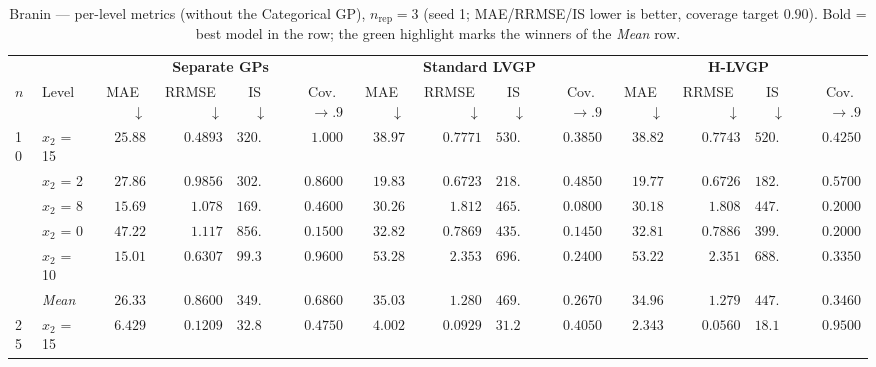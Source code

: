 \begin{table}[htbp]
\centering
\scriptsize
\setlength{\tabcolsep}{2.5pt}
\setlength{\fboxsep}{1pt}
\caption{Branin --- per-level metrics (without the Categorical GP), $n_{\mathrm{rep}}=3$ (seed 1; MAE/RRMSE/IS lower is better, coverage target $0.90$). Bold = best model in the row; the green highlight marks the winners of the \emph{Mean} row.}
\label{tab:branin_hetero_nrep03_nocat}
\begin{tabular}{llrrrrrrrrrrrr}
\toprule
 & & \multicolumn{4}{c}{\textbf{Separate GPs}} & \multicolumn{4}{c}{\textbf{Standard LVGP}} & \multicolumn{4}{c}{\textbf{H-LVGP}} \\
\cmidrule(lr){3-6} \cmidrule(lr){7-10} \cmidrule(lr){11-14}
$n$ & Level & MAE~$\downarrow$ & RRMSE~$\downarrow$ & IS~$\downarrow$ & Cov.~$\to.9$ & MAE~$\downarrow$ & RRMSE~$\downarrow$ & IS~$\downarrow$ & Cov.~$\to.9$ & MAE~$\downarrow$ & RRMSE~$\downarrow$ & IS~$\downarrow$ & Cov.~$\to.9$ \\
\midrule
\multirow{6}{*}{10} & $x_2$ = 15 & {\boldmath$25.88$} & {\boldmath$0.4893$} & {\boldmath$320.7$} & {\boldmath$1.000$} & $38.97$ & $0.7771$ & $530.2$ & $0.3850$ & $38.82$ & $0.7743$ & $520.3$ & $0.4250$ \\
 & $x_2$ = 2 & $27.86$ & $0.9856$ & $302.1$ & {\boldmath$0.8600$} & $19.83$ & {\boldmath$0.6723$} & $218.5$ & $0.4850$ & {\boldmath$19.77$} & $0.6726$ & {\boldmath$182.3$} & $0.5700$ \\
 & $x_2$ = 8 & {\boldmath$15.69$} & {\boldmath$1.078$} & {\boldmath$169.5$} & {\boldmath$0.4600$} & $30.26$ & $1.812$ & $465.1$ & $0.0800$ & $30.18$ & $1.808$ & $447.6$ & $0.2000$ \\
 & $x_2$ = 0 & $47.22$ & $1.117$ & $856.5$ & $0.1500$ & $32.82$ & {\boldmath$0.7869$} & $435.2$ & $0.1450$ & {\boldmath$32.81$} & $0.7886$ & {\boldmath$399.3$} & {\boldmath$0.2000$} \\
 & $x_2$ = 10 & {\boldmath$15.01$} & {\boldmath$0.6307$} & {\boldmath$99.37$} & {\boldmath$0.9600$} & $53.28$ & $2.353$ & $696.4$ & $0.2400$ & $53.22$ & $2.351$ & $688.1$ & $0.3350$ \\
 & \textit{Mean} & \colorbox{green!20}{\boldmath$26.33$} & \colorbox{green!20}{\boldmath$0.8600$} & \colorbox{green!20}{\boldmath$349.7$} & \colorbox{green!20}{\boldmath$0.6860$} & $35.03$ & $1.280$ & $469.1$ & $0.2670$ & $34.96$ & $1.279$ & $447.5$ & $0.3460$ \\
\midrule
\multirow{6}{*}{25} & $x_2$ = 15 & $6.429$ & $0.1209$ & $32.81$ & $0.4750$ & $4.002$ & $0.0929$ & $31.27$ & $0.4050$ & {\boldmath$2.343$} & {\boldmath$0.0560$} & {\boldmath$18.15$} & {\boldmath$0.9500$} \\

\end{tabular}
\end{table}
